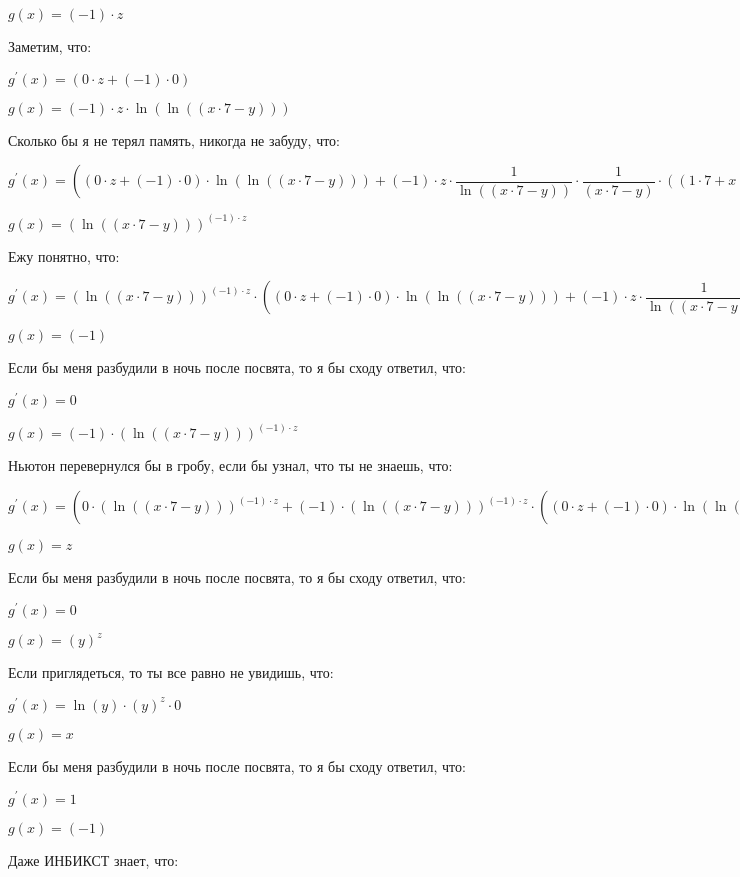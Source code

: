 \documentclass[a4paper,12pt]{article}
\begin{document}
\begin{flushleft}
$g(x) = (-1) \cdot z$

Заметим, что:

$g^{'}(x) = (0 \cdot z+(-1) \cdot 0)$

$g(x) = (-1) \cdot z \cdot \ln {(\ln {((x \cdot 7-y))})}$

Сколько бы я не терял память, никогда не забуду, что:

$g^{'}(x) = ((0 \cdot z+(-1) \cdot 0) \cdot \ln {(\ln {((x \cdot 7-y))})}+(-1) \cdot z \cdot  \dfrac{1}{\ln {((x \cdot 7-y))}}  \cdot  \dfrac{1}{(x \cdot 7-y)}  \cdot ((1 \cdot 7+x \cdot 0)-0))$

$g(x) = (\ln {((x \cdot 7-y))})^{(-1) \cdot z}$

Ежу понятно, что:

$g^{'}(x) = (\ln {((x \cdot 7-y))})^{(-1) \cdot z} \cdot ((0 \cdot z+(-1) \cdot 0) \cdot \ln {(\ln {((x \cdot 7-y))})}+(-1) \cdot z \cdot  \dfrac{1}{\ln {((x \cdot 7-y))}}  \cdot  \dfrac{1}{(x \cdot 7-y)}  \cdot ((1 \cdot 7+x \cdot 0)-0))$

$g(x) = (-1)$

Если бы меня разбудили в ночь после посвята, то я бы сходу ответил, что:

$g^{'}(x) = 0$

$g(x) = (-1) \cdot (\ln {((x \cdot 7-y))})^{(-1) \cdot z}$

Ньютон перевернулся бы в гробу, если бы узнал, что ты не знаешь, что:

$g^{'}(x) = (0 \cdot (\ln {((x \cdot 7-y))})^{(-1) \cdot z}+(-1) \cdot (\ln {((x \cdot 7-y))})^{(-1) \cdot z} \cdot ((0 \cdot z+(-1) \cdot 0) \cdot \ln {(\ln {((x \cdot 7-y))})}+(-1) \cdot z \cdot  \dfrac{1}{\ln {((x \cdot 7-y))}}  \cdot  \dfrac{1}{(x \cdot 7-y)}  \cdot ((1 \cdot 7+x \cdot 0)-0)))$

$g(x) = z$

Если бы меня разбудили в ночь после посвята, то я бы сходу ответил, что:

$g^{'}(x) = 0$

$g(x) = (y)^{z}$

Если приглядеться, то ты все равно не увидишь, что:

$g^{'}(x) = \ln {(y)} \cdot (y)^{z} \cdot 0$

$g(x) = x$

Если бы меня разбудили в ночь после посвята, то я бы сходу ответил, что:

$g^{'}(x) = 1$

$g(x) = (-1)$

Даже ИНБИКСТ знает, что:


\end{flushleft}
\end{document}
